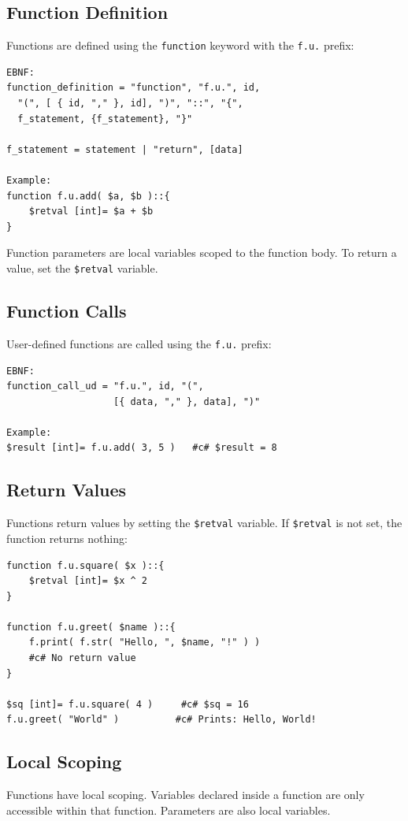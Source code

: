 \documentclass{report}
\begin{document}
\subsection{Function Definition}
Functions are defined using the \texttt{function} keyword with the \texttt{f.u.} prefix:
\begin{verbatim}
EBNF:
function_definition = "function", "f.u.", id, 
  "(", [ { id, "," }, id], ")", "::", "{", 
  f_statement, {f_statement}, "}"

f_statement = statement | "return", [data]

Example:
function f.u.add( $a, $b )::{
    $retval [int]= $a + $b
}
\end{verbatim}

Function parameters are local variables scoped to the function body. To return a value, set the \texttt{\$retval} variable.

\subsection{Function Calls}
User-defined functions are called using the \texttt{f.u.} prefix:
\begin{verbatim}
EBNF:
function_call_ud = "f.u.", id, "(", 
                   [{ data, "," }, data], ")"

Example:
$result [int]= f.u.add( 3, 5 )   #c# $result = 8
\end{verbatim}

\subsection{Return Values}
Functions return values by setting the \texttt{\$retval} variable. If \texttt{\$retval} is not set, the function returns nothing:
\begin{verbatim}
function f.u.square( $x )::{
    $retval [int]= $x ^ 2
}

function f.u.greet( $name )::{
    f.print( f.str( "Hello, ", $name, "!" ) )
    #c# No return value
}

$sq [int]= f.u.square( 4 )     #c# $sq = 16
f.u.greet( "World" )          #c# Prints: Hello, World!
\end{verbatim}

\subsection{Local Scoping}
\label{sec:function-scope}
Functions have local scoping. Variables declared inside a function are only accessible within that function. Parameters are also local variables.
\end{document}
